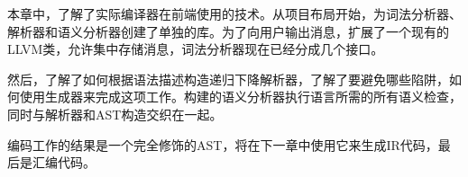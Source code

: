 本章中，了解了实际编译器在前端使用的技术。从项目布局开始，为词法分析器、解析器和语义分析器创建了单独的库。为了向用户输出消息，扩展了一个现有的LLVM类，允许集中存储消息，词法分析器现在已经分成几个接口。

然后，了解了如何根据语法描述构造递归下降解析器，了解了要避免哪些陷阱，如何使用生成器来完成这项工作。构建的语义分析器执行语言所需的所有语义检查，同时与解析器和AST构造交织在一起。

编码工作的结果是一个完全修饰的AST，将在下一章中使用它来生成IR代码，最后是汇编代码。